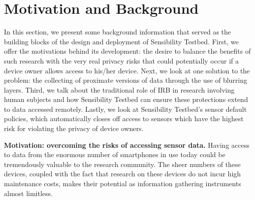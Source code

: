 \section{Motivation and Background}\label{sec-motivation}

In this section, we present some background information that 
served as the building blocks of the  design and deployment of 
Sensibility Testbed. First, we offer the motivations behind its 
development: the desire to balance the benefits of such research 
with the very real privacy risks that could potentially occur if a 
device owner allows access to his/her device. Next, we look at 
one solution to the problem: the collecting of proximate versions 
of data through the use of blurring layers. Third, we talk about 
the traditional role of IRB in research involving human subjects 
and how Sensibility Testbed can ensure these protections extend 
to data accessed remotely. Lastly, we look at Sensibility Testbed's 
sensor default policies, which automatically closes off access to 
sensors which have the highest risk for violating the privacy of 
device owners.


\textbf{Motivation: overcoming the risks of accessing sensor data.}
Having access to data from the enormous number of smartphones 
in use today could be tremendously valuable to the research community. 
The sheer numbers of these devices, coupled with the fact that research 
on these devices do not incur high maintenance costs, makes their 
potential as information gathering instruments almost limitless. 


